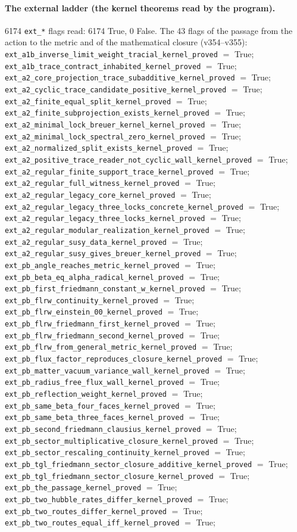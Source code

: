 \documentclass[11pt]{article}
\theoremstyle{definition}\newtheorem{deriv}{Derivation}
\begin{document}
\paragraph*{The external ladder (the kernel theorems read by the program).} 6174 \texttt{ext\_*} flags read: 6174 True, 0 False. The 43 flags of the passage from the action to the metric and of the mathematical closure (v354--v355): \texttt{ext\_a1b\_inverse\_limit\_weight\_tracial\_kernel\_proved} $=$ True; \texttt{ext\_a1b\_trace\_contract\_inhabited\_kernel\_proved} $=$ True; \texttt{ext\_a2\_core\_projection\_trace\_subadditive\_kernel\_proved} $=$ True; \texttt{ext\_a2\_cyclic\_trace\_candidate\_positive\_kernel\_proved} $=$ True; \texttt{ext\_a2\_finite\_equal\_split\_kernel\_proved} $=$ True; \texttt{ext\_a2\_finite\_subprojection\_exists\_kernel\_proved} $=$ True; \texttt{ext\_a2\_minimal\_lock\_breuer\_kernel\_kernel\_proved} $=$ True; \texttt{ext\_a2\_minimal\_lock\_spectral\_zero\_kernel\_proved} $=$ True; \texttt{ext\_a2\_normalized\_split\_exists\_kernel\_proved} $=$ True; \texttt{ext\_a2\_positive\_trace\_reader\_not\_cyclic\_wall\_kernel\_proved} $=$ True; \texttt{ext\_a2\_regular\_finite\_support\_trace\_kernel\_proved} $=$ True; \texttt{ext\_a2\_regular\_full\_witness\_kernel\_proved} $=$ True; \texttt{ext\_a2\_regular\_legacy\_core\_kernel\_proved} $=$ True; \texttt{ext\_a2\_regular\_legacy\_three\_locks\_concrete\_kernel\_proved} $=$ True; \texttt{ext\_a2\_regular\_legacy\_three\_locks\_kernel\_proved} $=$ True; \texttt{ext\_a2\_regular\_modular\_realization\_kernel\_proved} $=$ True; \texttt{ext\_a2\_regular\_susy\_data\_kernel\_proved} $=$ True; \texttt{ext\_a2\_regular\_susy\_gives\_breuer\_kernel\_proved} $=$ True; \texttt{ext\_pb\_angle\_reaches\_metric\_kernel\_proved} $=$ True; \texttt{ext\_pb\_beta\_eq\_alpha\_radical\_kernel\_proved} $=$ True; \texttt{ext\_pb\_first\_friedmann\_constant\_w\_kernel\_proved} $=$ True; \texttt{ext\_pb\_flrw\_continuity\_kernel\_proved} $=$ True; \texttt{ext\_pb\_flrw\_einstein\_00\_kernel\_proved} $=$ True; \texttt{ext\_pb\_flrw\_friedmann\_first\_kernel\_proved} $=$ True; \texttt{ext\_pb\_flrw\_friedmann\_second\_kernel\_proved} $=$ True; \texttt{ext\_pb\_flrw\_from\_general\_metric\_kernel\_proved} $=$ True; \texttt{ext\_pb\_flux\_factor\_reproduces\_closure\_kernel\_proved} $=$ True; \texttt{ext\_pb\_matter\_vacuum\_variance\_wall\_kernel\_proved} $=$ True; \texttt{ext\_pb\_radius\_free\_flux\_wall\_kernel\_proved} $=$ True; \texttt{ext\_pb\_reflection\_weight\_kernel\_proved} $=$ True; \texttt{ext\_pb\_same\_beta\_four\_faces\_kernel\_proved} $=$ True; \texttt{ext\_pb\_same\_beta\_three\_faces\_kernel\_proved} $=$ True; \texttt{ext\_pb\_second\_friedmann\_clausius\_kernel\_proved} $=$ True; \texttt{ext\_pb\_sector\_multiplicative\_closure\_kernel\_proved} $=$ True; \texttt{ext\_pb\_sector\_rescaling\_continuity\_kernel\_proved} $=$ True; \texttt{ext\_pb\_tgl\_friedmann\_sector\_closure\_additive\_kernel\_proved} $=$ True; \texttt{ext\_pb\_tgl\_friedmann\_sector\_closure\_kernel\_proved} $=$ True; \texttt{ext\_pb\_the\_passage\_kernel\_proved} $=$ True; \texttt{ext\_pb\_two\_hubble\_rates\_differ\_kernel\_proved} $=$ True; \texttt{ext\_pb\_two\_routes\_differ\_kernel\_proved} $=$ True; \texttt{ext\_pb\_two\_routes\_equal\_iff\_kernel\_proved} $=$ True; 
\end{document}
